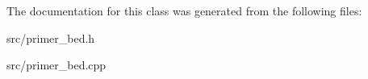 The documentation for this class was generated from the following files\+:\begin{DoxyCompactItemize}
\item 
src/primer\+\_\+bed.\+h\item 
src/primer\+\_\+bed.\+cpp\end{DoxyCompactItemize}
